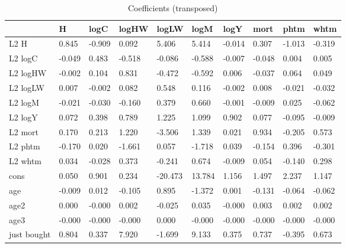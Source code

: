 \begin{table}[htbp]
\caption{\label{clabel} Coefficients (transposed)}\centering\medskip
\begin{tabular}{llllllllll} \hline \hline
 & H  & logC  & logHW  & logLW  & logM  & logY  & mort  & phtm  & whtm  \\  \hline 
L2 H &     0.845 &    -0.909 &     0.092 &     5.406 &     5.414 &    -0.014 &     0.307 &    -1.013 &    -0.319 \\  
L2 logC &    -0.049 &     0.483 &    -0.518 &    -0.086 &    -0.588 &    -0.007 &    -0.048 &     0.004 &     0.005 \\  
L2 logHW &    -0.002 &     0.104 &     0.831 &    -0.472 &    -0.592 &     0.006 &    -0.037 &     0.064 &     0.049 \\  
L2 logLW &     0.007 &    -0.002 &     0.082 &     0.548 &     0.116 &    -0.002 &     0.008 &    -0.021 &    -0.032 \\  
L2 logM &    -0.021 &    -0.030 &    -0.160 &     0.379 &     0.660 &    -0.001 &    -0.009 &     0.025 &    -0.062 \\  
L2 logY &     0.072 &     0.398 &     0.789 &     1.225 &     1.099 &     0.902 &     0.077 &    -0.095 &    -0.009 \\  
L2 mort &     0.170 &     0.213 &     1.220 &    -3.506 &     1.339 &     0.021 &     0.934 &    -0.205 &     0.573 \\  
L2 phtm &    -0.170 &     0.020 &    -1.661 &     0.057 &    -1.718 &     0.039 &    -0.154 &     0.396 &    -0.301 \\  
L2 whtm &     0.034 &    -0.028 &     0.373 &    -0.241 &     0.674 &    -0.009 &     0.054 &    -0.140 &     0.298 \\  
cons &     0.050 &     0.901 &     0.234 &   -20.473 &    13.784 &     1.156 &     1.497 &     2.237 &     1.147 \\  
age &    -0.009 &     0.012 &    -0.105 &     0.895 &    -1.372 &     0.001 &    -0.131 &    -0.064 &    -0.062 \\  
age2 &     0.000 &    -0.000 &     0.002 &    -0.025 &     0.035 &    -0.000 &     0.003 &     0.002 &     0.002 \\  
age3 &    -0.000 &    -0.000 &    -0.000 &     0.000 &    -0.000 &    -0.000 &    -0.000 &    -0.000 &    -0.000 \\  
just bought &     0.804 &     0.337 &     7.920 &    -1.699 &     9.133 &     0.375 &     0.737 &    -0.395 &     0.673 \\  
\hline \hline \end{tabular}
\end{table}
